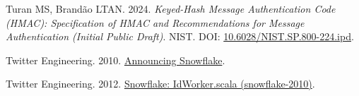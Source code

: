 \documentclass[fleqn,10pt,lineno]{wlpeerj}
\newlength{\cslhangindent}
\newenvironment{CSLReferences}[2]
 {\begin{list}{}{%
  \setlength{\itemindent}{0pt}
  \setlength{\leftmargin}{0pt}
  \setlength{\parsep}{0pt}
  \ifodd #1
   \setlength{\leftmargin}{\cslhangindent}
   \setlength{\itemindent}{-1\cslhangindent}
  \fi
  \setlength{\itemsep}{#2\baselineskip}}}
 {\end{list}}
\begin{document}
\begin{CSLReferences}{1}{0}
Turan MS, Brandão LTAN. 2024. \emph{{Keyed-Hash Message Authentication
Code (HMAC): Specification of HMAC and Recommendations for Message
Authentication (Initial Public Draft)}}. NIST. DOI:
\href{https://doi.org/10.6028/NIST.SP.800-224.ipd}{10.6028/NIST.SP.800-224.ipd}.

Twitter Engineering. 2010.
\href{https://blog.x.com/engineering/en_us/a/2010/announcing-snowflake}{{Announcing
Snowflake}}.

Twitter Engineering. 2012.
\href{https://github.com/twitter-archive/snowflake/blob/b3f6a3c6ca8e1b6847baa6ff42bf72201e2c2231/src/main/scala/com/twitter/service/snowflake/IdWorker.scala}{{Snowflake:
IdWorker.scala (snowflake-2010)}}.

\end{CSLReferences}
\end{document}
